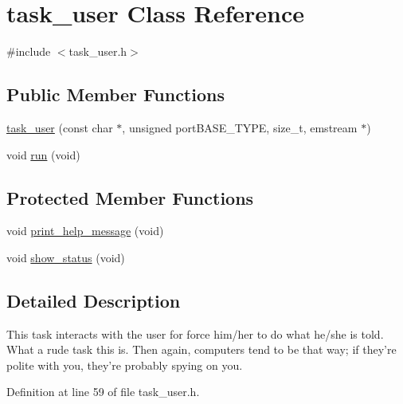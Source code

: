 \hypertarget{classtask__user}{\section{task\-\_\-user \-Class \-Reference}
\label{classtask__user}
}


{\ttfamily \#include $<$task\-\_\-user.\-h$>$}

\subsection*{\-Public \-Member \-Functions}
\begin{DoxyCompactItemize}
\item 
\hyperlink{classtask__user_a3aba77563b375bb14838800608da48bc}{task\-\_\-user} (const char $\ast$, unsigned port\-B\-A\-S\-E\-\_\-\-T\-Y\-P\-E, size\-\_\-t, emstream $\ast$)
\item 
void \hyperlink{classtask__user_adca6429d57be25e8d411414fc8ad75af}{run} (void)
\end{DoxyCompactItemize}
\subsection*{\-Protected \-Member \-Functions}
\begin{DoxyCompactItemize}
\item 
void \hyperlink{classtask__user_a75475060f83bae1e44bcc8a5c34015c7}{print\-\_\-help\-\_\-message} (void)
\item 
void \hyperlink{classtask__user_a105bebbd9cb1031154c3dfc3662db4a0}{show\-\_\-status} (void)
\end{DoxyCompactItemize}


\subsection{\-Detailed \-Description}
\-This task interacts with the user for force him/her to do what he/she is told. \-What a rude task this is. \-Then again, computers tend to be that way; if they're polite with you, they're probably spying on you. 

\-Definition at line 59 of file task\-\_\-user.\-h.



